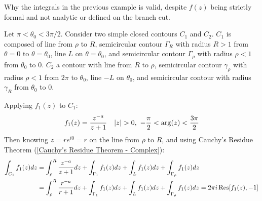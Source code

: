 \documentclass[12pt, english]{book}
\makeatletter
\renewenvironment{proof}[1][\proofname]{\par
	\pushQED{\qed}%
	\normalfont \topsep6\p@\@plus6\p@\relax
	\list{}{%
		\settowidth{\leftmargin}{\itshape\proofname:\hskip\labelsep}%
		\setlength{\labelwidth}{0pt}%
		\setlength{\itemindent}{-\leftmargin}%
		}%
	\item[\hskip\labelsep\itshape#1\@addpunct{:}]\ignorespaces
	}{\popQED\endlist\@endpefalse}
\makeatother
\begin{document}
	\begin{example}
		Why the integrals in the previous example is valid, despite \(f(z)\) being strictly formal and not analytic or defined on the branch cut.
		\begin{proof}
			{\color{Grey}
				Let \(\pi < \theta_0 < 3\pi/2\). Consider two simple closed contours 
				\(C_1\) and \(C_2\). \(C_1\) is composed of line from \(\rho\) to \(R\), semicircular contour \(\Gamma_R\) with radius \(R >1\) from \(\theta = 0\) to \(\theta = \theta_0\), line \(L\) on \(\theta = \theta_0\), and semicircular contour \(\Gamma_\rho\) with radius \(\rho<1\) from \(\theta_0\) to \(0\). 
				\(C_2\) a contour with line from \(R\) to \(\rho\), semicircular contour \(\gamma_\rho\) with radius \(\rho<1\) from \(2\pi\) to \(\theta_0\), line \(-L\) on \(\theta_0\), and semicircular contour with radius \(\gamma_R\) from \(\theta_0\) to \(0\).
				
				Applying \(f_1 (z)\) to \(C_1\):
				\begin{align*}
					f_1 (z) &= \frac{z^{-a}}{z+1}	
					& \abs{z}>0, \ -\frac{\pi}{2} < \arg(z) < \frac{3\pi}{2}
				\end{align*}
				Then knowing \(z = re^{i0} = r\) on the line from \(\rho\) to \(R\), and using Cauchy's Residue Theorem (\cref{Cauchy's Residue Theorem - Complex}):
				\begin{align*}
					\int_{C_1} f_1 (z) dz 
					&= \int_{\rho}^{R} \frac{z^{-a}}{z+1} dz + \int_{\Gamma_1} f_1 (z) dz
					+ \int_{L} f_1 (z) dz + \int_{\Gamma_\rho} f_1 (z) dz \\
					&= \int_{\rho}^{R} \frac{r^{-a}}{r+1} dz + \int_{\Gamma_1} f_1 (z) dz
					+ \int_{L} f_1 (z) dz + \int_{\Gamma_\rho} f_1 (z) dz 
					= 2\pi i \Res[f_1 (z), -1]
				\end{align*}
				
}
\end{proof}
\end{example}
\end{document}
